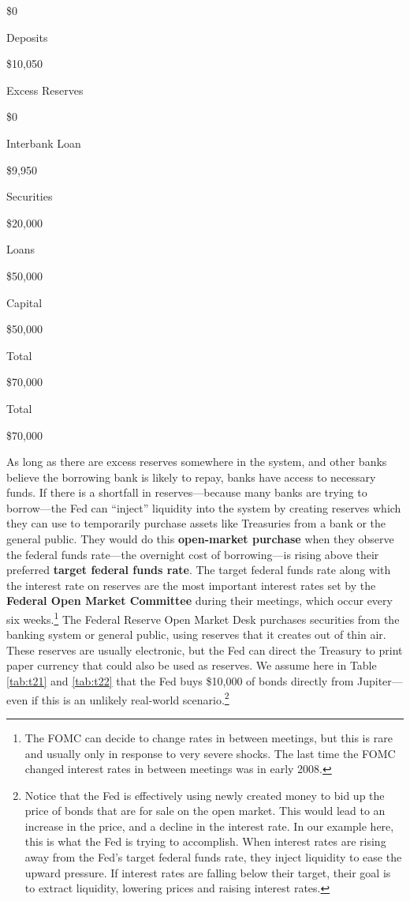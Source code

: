 \documentclass[
]{book}
\begin{document}
\$0

Deposits

\$10,050

Excess Reserves

\$0

Interbank Loan

\$9,950

Securities

\$20,000

Loans

\$50,000

Capital

\$50,000

Total

\$70,000

Total

\$70,000

As long as there are excess reserves somewhere in the system, and other banks believe the borrowing bank is likely to repay, banks have access to necessary funds. If there is a shortfall in reserves---because many banks are trying to borrow---the Fed can ``inject'' liquidity into the system by creating reserves which they can use to temporarily purchase assets like Treasuries from a bank or the general public. They would do this \textbf{open-market purchase} when they observe the federal funds rate---the overnight cost of borrowing---is rising above their preferred \textbf{target federal funds rate}. The target federal funds rate along with the interest rate on reserves are the most important interest rates set by the \textbf{Federal Open Market Committee} during their meetings, which occur every six weeks.\footnote{The FOMC can decide to change rates in between meetings, but this is rare and usually only in response to very severe shocks. The last time the FOMC changed interest rates in between meetings was in early 2008.} The Federal Reserve Open Market Desk purchases securities from the banking system or general public, using reserves that it creates out of thin air. These reserves are usually electronic, but the Fed can direct the Treasury to print paper currency that could also be used as reserves. We assume here in Table \ref{tab:t21} and \ref{tab:t22} that the Fed buys \$10,000 of bonds directly from Jupiter---even if this is an unlikely real-world scenario.\footnote{Notice that the Fed is effectively using newly created money to bid up the price of bonds that are for sale on the open market. This would lead to an increase in the price, and a decline in the interest rate. In our example here, this is what the Fed is trying to accomplish. When interest rates are rising away from the Fed's target federal funds rate, they inject liquidity to ease the upward pressure. If interest rates are falling below their target, their goal is to extract liquidity, lowering prices and raising interest rates.}
\end{document}
